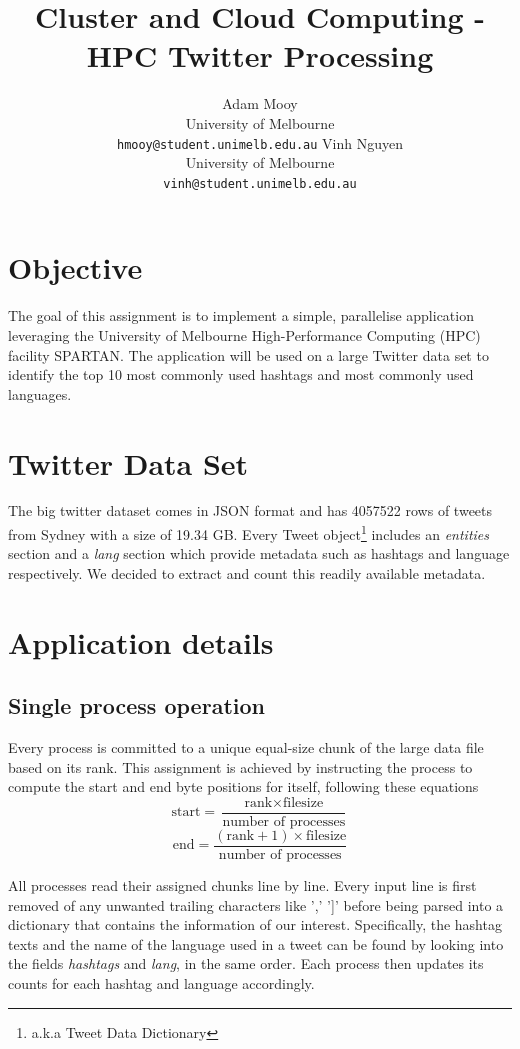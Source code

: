 \documentclass[11pt]{article}
\title{Cluster and Cloud Computing - HPC Twitter Processing}
\author{Adam Mooy\\
	    University of Melbourne\\
	    {\tt hmooy@student.unimelb.edu.au}
  \And Vinh Nguyen\\
  	University of Melbourne\\
	    {\tt vinh@student.unimelb.edu.au}}
\begin{document}
\maketitle

\section{Objective}

The goal of this assignment is to implement a simple, parallelise application leveraging the University of Melbourne High-Performance Computing (HPC) facility SPARTAN. The application will be used on a large Twitter data set to identify the top 10 most commonly used hashtags and most commonly used languages.

\section{Twitter Data Set}
The big twitter dataset comes in JSON format and has 4057522 rows of tweets from Sydney with a size of 19.34 GB. Every Tweet object\footnote{a.k.a Tweet Data Dictionary} includes an \textit{entities} section and a \textit{lang} section which provide metadata such as hashtags and language respectively. We decided to extract and count this readily available metadata. 

\section{Application details}
\subsection{Single process operation}
Every process is committed to a unique equal-size chunk of the large data file based on its rank. This assignment is achieved by instructing the process to compute the start and end byte positions for itself, following these equations
\[\textrm{start} =  \frac{\textrm{rank} \times \textrm{filesize}}{\textrm{number of processes}} \] 
\[\textrm{end} =  \frac{(\textrm{rank}+1) \times \textrm{filesize}}{\textrm{number of processes}} \] 

All processes read their assigned chunks line by line. Every input line is first removed of any unwanted trailing characters like ',' ']' before being parsed into a dictionary that contains the information of our interest. Specifically, the hashtag texts and the name of the language used in a tweet can be found by looking into the fields \textit{hashtags} and \textit{lang}, in the same order. Each process then updates its counts for each hashtag and language accordingly. 
\end{document}
